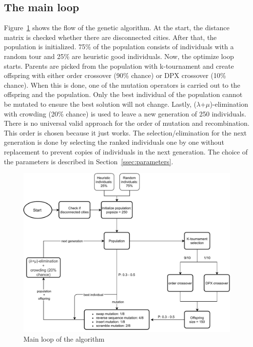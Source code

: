 \documentclass[a4paper,10pt]{article}
\begin{document}
\subsection{The main loop}\label{ssec:mainloop}

Figure~\ref{fig:codeflow} shows the flow of the genetic algorithm. At the start, the distance matrix is checked whether there are disconnected cities. After that, the population is initialized. 75\% of the population consists of individuals with a random tour and 25\% are heuristic good individuals. Now, the optimize loop starts. Parents are picked from the population with k-tournament and create offspring with either order crossover (90\% chance) or DPX crossover (10\% chance). When this is done, one of the mutation operators is carried out to the offspring and the population. Only the best individual of the population cannot be mutated to ensure the best solution will not change. Lastly, ($\lambda$+$\mu$)-elimination with crowding (20\% chance) is used to leave a new generation of 250 individuals. 
There is no universal valid approach for the order of mutation and recombination. This order is chosen because it just works. The selection/elimination for the next generation is done by selecting the ranked individuals one by one without replacement to prevent copies of individuals in the next generation.
The choice of the parameters is described in Section~\ref{ssec:parameters}.

\begin{figure}[H]
  \centering
  \includegraphics[width=\linewidth]{img/codeflow.pdf}
  \caption{Main loop of the algorithm}
  \label{fig:codeflow}
\end{figure}
\end{document}
